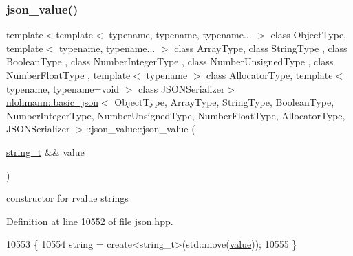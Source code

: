 \subsubsection{\texorpdfstring{json\+\_\+value()}{json\_value()}\hspace{0.1cm}{\footnotesize\ttfamily [8/12]}}
{\footnotesize\ttfamily template$<$template$<$ typename, typename, typename... $>$ class Object\+Type, template$<$ typename, typename... $>$ class Array\+Type, class String\+Type , class Boolean\+Type , class Number\+Integer\+Type , class Number\+Unsigned\+Type , class Number\+Float\+Type , template$<$ typename $>$ class Allocator\+Type, template$<$ typename, typename=void $>$ class J\+S\+O\+N\+Serializer$>$ \\
\hyperlink{classnlohmann_1_1basic__json}{nlohmann\+::basic\+\_\+json}$<$ Object\+Type, Array\+Type, String\+Type, Boolean\+Type, Number\+Integer\+Type, Number\+Unsigned\+Type, Number\+Float\+Type, Allocator\+Type, J\+S\+O\+N\+Serializer $>$\+::json\+\_\+value\+::json\+\_\+value (\begin{DoxyParamCaption}\item[{\hyperlink{classnlohmann_1_1basic__json_a61f8566a1a85a424c7266fb531dca005}{string\+\_\+t} \&\&}]{value }\end{DoxyParamCaption})\hspace{0.3cm}{\ttfamily [inline]}}



constructor for rvalue strings 



Definition at line 10552 of file json.\+hpp.


\begin{DoxyCode}
10553         \{
10554             \textcolor{keywordtype}{string} = create<string\_t>(std::move(\hyperlink{classnlohmann_1_1basic__json_adcf8ca5079f5db993820bf50036bf45d}{value}));
10555         \}
\end{DoxyCode}
\mbox{\label{unionnlohmann_1_1basic__json_1_1json__value_a74330ab1bc8ce1d0c6e2ee711c150563}} 
